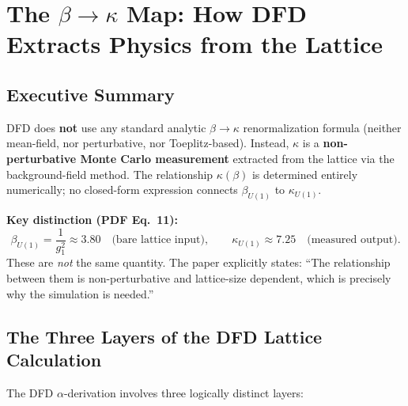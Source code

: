 
\section{The $\beta \to \kappa$ Map: How DFD Extracts Physics from the Lattice}

\subsection{Executive Summary}

DFD does \textbf{not} use any standard analytic $\beta \to \kappa$ renormalization formula
(neither mean-field, nor perturbative, nor Toeplitz-based).
Instead, $\kappa$ is a \textbf{non-perturbative Monte Carlo measurement} extracted
from the lattice via the background-field method. The relationship
$\kappa(\beta)$ is determined entirely numerically; no closed-form expression
connects $\beta_{U(1)}$ to $\kappa_{U(1)}$.

\medskip
\noindent\textbf{Key distinction (PDF Eq.~11):}
\begin{equation}
\beta_{U(1)} = \frac{1}{g_1^2} \approx 3.80 \quad \text{(bare lattice input)},
\qquad
\kappa_{U(1)} \approx 7.25 \quad \text{(measured output)}.
\end{equation}
These are \emph{not} the same quantity. The paper explicitly states:
``The relationship between them is non-perturbative and lattice-size dependent,
which is precisely why the simulation is needed.''

\subsection{The Three Layers of the DFD Lattice Calculation}

The DFD $\alpha$-derivation involves three logically distinct layers:

